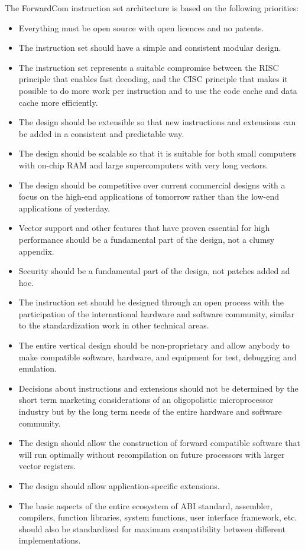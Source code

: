 \documentclass[forwardcom.tex]{subfiles}
\begin{document}
The ForwardCom instruction set architecture is based on the following priorities:
\begin{itemize}
\item Everything must be open source with open licences and no patents.
\item The instruction set should have a simple and consistent modular design.
\item The instruction set represents a suitable compromise between the RISC principle that enables fast decoding, and the CISC principle that makes it possible to do more work per instruction and to use the code cache and data cache more efficiently.
\item The design should be extensible so that new instructions and extensions can be added in a consistent and predictable way.
\item The design should be scalable so that it is suitable for both small computers with on-chip RAM and large supercomputers with very long vectors.
\item The design should be competitive over current commercial designs with a focus on the high-end applications of tomorrow rather than the low-end applications of yesterday.
\item Vector support and other features that have proven essential for high performance should be a fundamental part of the design, not a clumsy appendix.
\item Security should be a fundamental part of the design, not patches added ad hoc.
\item The instruction set should be designed through an open process with the participation of the international hardware and software community, similar to the standardization work in other technical areas.
\item The entire vertical design should be non-proprietary and allow anybody to make compatible software, hardware, and equipment for test, debugging and emulation.
\item Decisions about instructions and extensions should not be determined by the short term marketing considerations of an oligopolistic microprocessor industry but by the long term needs of the entire hardware and software community.
\item The design should allow the construction of forward compatible software that will run optimally without recompilation on future processors with larger vector registers.
\item The design should allow application-specific extensions.
\item The basic aspects of the entire ecosystem of ABI standard, assembler, compilers, function libraries, system functions, user interface framework, etc. should also be standardized for maximum compatibility between different implementations.
\end{itemize}
\end{document}
